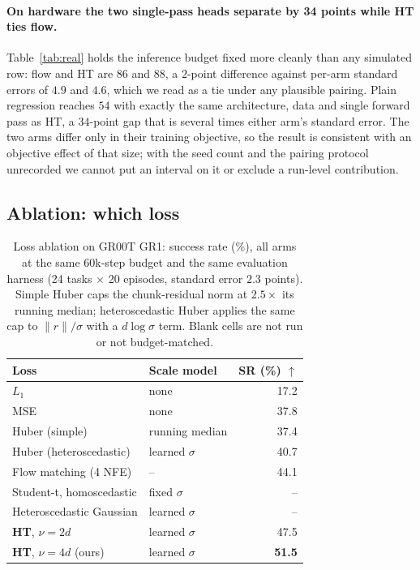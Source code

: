 \paragraph{On hardware the two single-pass heads separate by 34 points while
HT ties flow.} Table~\ref{tab:real} holds the inference budget fixed more
cleanly than any simulated row: flow and HT are $86$ and $88$, a
$2$-point difference against per-arm standard errors of $4.9$ and $4.6$, which
we read as a tie under any plausible pairing. Plain regression reaches $54$ with
exactly the same architecture, data and single forward pass as HT, a $34$-point
gap that is several times either arm's standard error. The two arms differ only
in their training objective, so the result is consistent with an objective
effect of that size; with the seed count and the pairing protocol unrecorded we
cannot put an interval on it or exclude a run-level contribution.

\subsection{Ablation: which loss}
\label{sec:exp:ablation}

\begin{table}[t]
\centering
\caption{Loss ablation on GR00T GR1: success rate (\%), all arms at the same 60k-step budget and
the same evaluation harness (24 tasks $\times$ 20 episodes, standard error
$2.3$ points). Simple Huber caps the chunk-residual norm at $2.5\times$ its
running median; heteroscedastic Huber applies the same cap to $\lVert r
\rVert/\sigma$ with a $d\log\sigma$ term. Blank cells are not run or not
budget-matched.}
\label{tab:ablation}
\begin{tabular}{llr}
\toprule
Loss & Scale model & SR (\%) $\uparrow$ \\
\midrule
$L_1$                                & none                & 17.2 \\
MSE                                  & none                & 37.8 \\
Huber (simple)                       & running median      & 37.4 \\
Huber (heteroscedastic)              & learned $\sigma$    & 40.7 \\
Flow matching (4 NFE)                & --                  & 44.1 \\
Student-t, homoscedastic             & fixed $\sigma$      & --   \\
Heteroscedastic Gaussian             & learned $\sigma$    & --   \\
\textbf{HT}, $\nu = 2d$              & learned $\sigma$    & 47.5 \\
\textbf{HT}, $\nu = 4d$ (ours)       & learned $\sigma$    & \textbf{51.5} \\
\bottomrule
\end{tabular}
\end{table}


